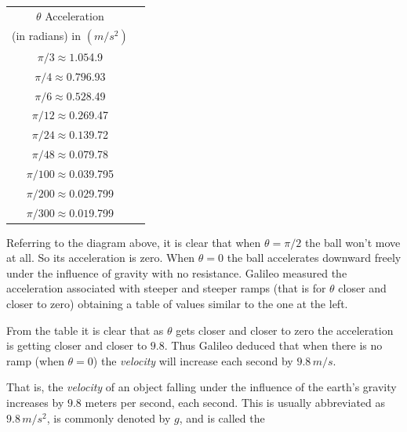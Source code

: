 \begin{table}
  \vskip-2mm{}
  \captionsetup{labelformat=empty}
  \begin{tabular}{c|c}
    \hline
    $\theta$ \amp{}Acceleration\\
    (in radians)      \amp{} in $(m/s^2)$\\[2mm]
    \hline{}
    $\pi/3\approx1.05$\amp{}4.9\\
    $\pi/4\approx0.79$\amp{}6.93\\
    $\pi/6\approx0.52$\amp{}8.49\\
    $\pi/12\approx0.26$\amp{}9.47\\
    $\pi/24\approx0.13$\amp{}9.72\\
    $\pi/48\approx0.07$\amp{}9.78\\
    $\pi/100\approx0.03$\amp{}9.795\\
    $\pi/200\approx0.02$\amp{}9.799\\
    $\pi/300\approx0.01$\amp{}9.799\\\hline
  \end{tabular}
\end{table}
Referring to the diagram above, it is clear that when $\theta=\pi/2$ the ball won't
move at all. So its acceleration is zero. When $\theta=0$ the ball
accelerates downward freely under the influence of gravity with no
resistance.  Galileo measured the
acceleration associated with steeper and steeper ramps (that is for
$\theta$ closer and closer to zero) obtaining a table of values
similar to the one at the left.

From the table it is clear that as $\theta$ gets closer and closer to
zero the acceleration is getting closer and closer to $9.8.$ Thus
Galileo  deduced that when there is no ramp (when
$\theta =0$) the \emph{velocity} will increase each second by $9.8\,
m/s.$ 

That is, the \emph{velocity} of an object falling under the influence
of the earth's gravity increases by $9.8$ meters per second, each
second. This is usually abbreviated as $9.8\,m/s^2$, is commonly
denoted by $g$, and is called the 

